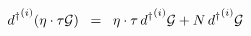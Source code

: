 \begin{equation}
{d^{\dagger}}^{(i)} ( \eta \cdot \tau {\cal{G}} ) \;\; = \;\; \eta \cdot \tau\, {d^{\dagger}}^{(i)} {\cal{G}} + N\, {d^{\dagger}}^{(i)} {\cal{G}} 
\label{eq:x7a}
\end{equation}

